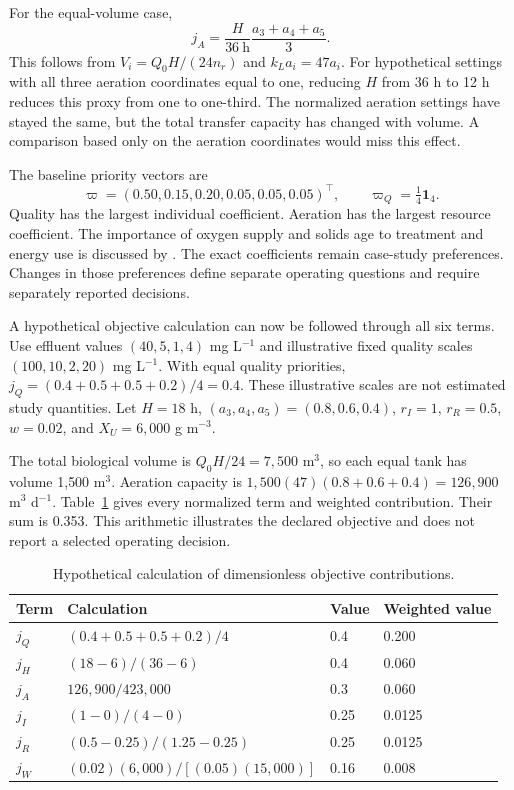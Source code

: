 For the equal-volume case,
\begin{equation}
j_A=\frac{H}{36\ \mathrm{h}}\frac{a_3+a_4+a_5}{3}.
\label{eq:plant_aeration_proxy_example}
\end{equation}
This follows from $V_i=Q_0H/(24n_r)$ and $k_La_i=47a_i$. For hypothetical settings with all three aeration coordinates equal to one, reducing $H$ from 36 h to 12 h reduces this proxy from one to one-third. The normalized aeration settings have stayed the same, but the total transfer capacity has changed with volume. A comparison based only on the aeration coordinates would miss this effect.

The baseline priority vectors are
\begin{equation}
\varpi=(0.50,0.15,0.20,0.05,0.05,0.05)^\top,\qquad
\varpi_Q=\tfrac14\mathbf1_4.
\label{eq:plant_objective_priorities}
\end{equation}
Quality has the largest individual coefficient. Aeration has the largest resource coefficient. The importance of oxygen supply and solids age to treatment and energy use is discussed by \citet{Leu2012}. The exact coefficients remain case-study preferences. Changes in those preferences define separate operating questions and require separately reported decisions.

A hypothetical objective calculation can now be followed through all six terms. Use effluent values $(40,5,1,4)$ mg L$^{-1}$ and illustrative fixed quality scales $(100,10,2,20)$ mg L$^{-1}$. With equal quality priorities, $j_Q=(0.4+0.5+0.5+0.2)/4=0.4$. These illustrative scales are not estimated study quantities. Let $H=18$ h, $(a_3,a_4,a_5)=(0.8,0.6,0.4)$, $r_I=1$, $r_R=0.5$, $w=0.02$, and $X_U=6{,}000$ g m$^{-3}$.

The total biological volume is $Q_0H/24=7{,}500$ m$^3$, so each equal tank has volume 1{,}500 m$^3$. Aeration capacity is $1{,}500(47)(0.8+0.6+0.4)=126{,}900$ m$^3$ d$^{-1}$. Table~\ref{tab:plant_hypothetical_objective} gives every normalized term and weighted contribution. Their sum is 0.353. This arithmetic illustrates the declared objective and does not report a selected operating decision.

\begin{table}[htbp]
\centering\small
\caption{Hypothetical calculation of dimensionless objective contributions.}
\label{tab:plant_hypothetical_objective}
\begin{tabular}{llll}
\toprule Term & Calculation & Value & Weighted value\\\midrule
$j_Q$ & $(0.4+0.5+0.5+0.2)/4$ & 0.4 & 0.200\\
$j_H$ & $(18-6)/(36-6)$ & 0.4 & 0.060\\
$j_A$ & $126{,}900/423{,}000$ & 0.3 & 0.060\\
$j_I$ & $(1-0)/(4-0)$ & 0.25 & 0.0125\\
$j_R$ & $(0.5-0.25)/(1.25-0.25)$ & 0.25 & 0.0125\\
$j_W$ & $(0.02)(6{,}000)/[(0.05)(15{,}000)]$ & 0.16 & 0.008\\
\bottomrule
\end{tabular}
\end{table}


